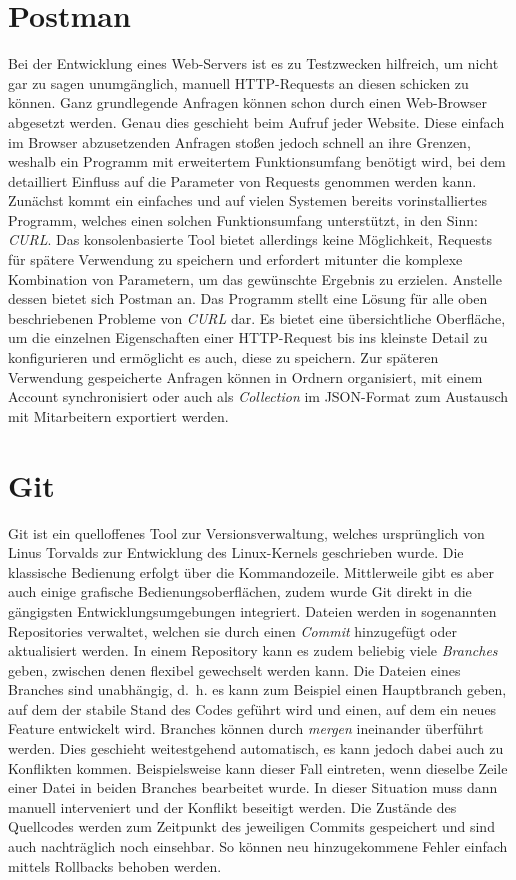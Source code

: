 \section{Postman}
Bei der Entwicklung eines Web-Servers ist es zu Testzwecken hilfreich, um nicht gar zu sagen unumgänglich, manuell \ac{HTTP}-Requests an diesen schicken zu können.
Ganz grundlegende Anfragen können schon durch einen Web-Browser abgesetzt werden.
Genau dies geschieht beim Aufruf jeder Website.
Diese einfach im Browser abzusetzenden Anfragen stoßen jedoch schnell an ihre Grenzen, weshalb ein Programm mit erweitertem Funktionsumfang benötigt wird, bei dem detailliert Einfluss auf die Parameter von Requests genommen werden kann.
Zunächst kommt ein einfaches und auf vielen Systemen bereits vorinstalliertes Programm, welches einen solchen Funktionsumfang unterstützt, in den Sinn: \emph{CURL}.
Das konsolenbasierte Tool bietet allerdings keine Möglichkeit, Requests für spätere Verwendung zu speichern und erfordert mitunter die komplexe Kombination von Parametern, um das gewünschte Ergebnis zu erzielen.
Anstelle dessen bietet sich Postman an.
Das Programm stellt eine Lösung für alle oben beschriebenen Probleme von \emph{CURL} dar.
Es bietet eine übersichtliche Oberfläche, um die einzelnen Eigenschaften einer \ac{HTTP}-Request bis ins kleinste Detail zu konfigurieren und ermöglicht es auch, diese zu speichern.
Zur späteren Verwendung gespeicherte Anfragen können in Ordnern organisiert, mit einem Account synchronisiert oder auch als \emph{Collection} im \ac{JSON}-Format zum Austausch mit Mitarbeitern exportiert werden.

\section{Git}
Git ist ein quelloffenes Tool zur Versionsverwaltung, welches ursprünglich von Linus Torvalds zur Entwicklung des Linux-Kernels geschrieben wurde.
Die klassische Bedienung erfolgt über die Kommandozeile.
Mittlerweile gibt es aber auch einige grafische Bedienungsoberflächen, zudem wurde Git direkt in die gängigsten Entwicklungsumgebungen integriert.
Dateien werden in sogenannten Repositories verwaltet, welchen sie durch einen \emph{Commit} hinzugefügt oder aktualisiert werden.
In einem Repository kann es zudem beliebig viele \emph{Branches} geben, zwischen denen flexibel gewechselt werden kann.
Die Dateien eines Branches sind unabhängig, d. h. es kann zum Beispiel einen Hauptbranch geben, auf dem der stabile Stand des Codes geführt wird und einen, auf dem ein neues Feature entwickelt wird.
Branches können durch \emph{mergen} ineinander überführt werden.
Dies geschieht weitestgehend automatisch, es kann jedoch dabei auch zu Konflikten kommen.
Beispielsweise kann dieser Fall eintreten, wenn dieselbe Zeile einer Datei in beiden Branches bearbeitet wurde.
In dieser Situation muss dann manuell interveniert und der Konflikt beseitigt werden.
Die Zustände des Quellcodes werden zum Zeitpunkt des jeweiligen Commits gespeichert und sind auch nachträglich noch einsehbar.
So können neu hinzugekommene Fehler einfach mittels Rollbacks behoben werden.


